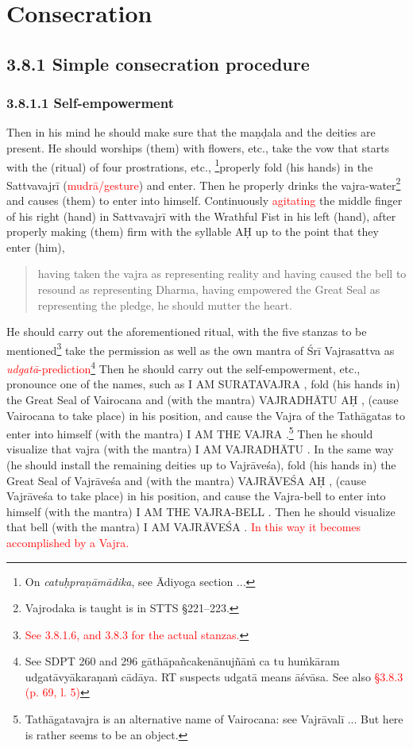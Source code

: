 \documentclass[11pt]{book}
\makeatletter
\def\fakesc#1{%
  \begingroup%
  \xdef\fake@name{\csname\curr@fontshape/\f@size\endcsname}%
  \fontsize{1.3\fontdimen8\fake@name}{\baselineskip}\selectfont%
  \uppercase{#1}%
  \endgroup%
}
\newcommand{\mantra}[1]{\fakesc{#1}}
\newcommand{\red}[1]{\textcolor{red}{#1}}
\newcommand{\skt}[1]{\emph{#1}}
\makeatother
\begin{document}
\section{Consecration}
\subsection{3.8.1 Simple consecration procedure}%
\subsubsection{3.8.1.1 Self-empowerment}
Then in his mind he should make sure that the maṇḍala and the deities are present. He should worships (them) with flowers, etc., take the vow that starts with the (ritual) of four prostrations, etc., \footnote{On \skt{catuḥpraṇāmādika}, see Ādiyoga section ...}properly fold (his hands) in the Sattvavajrī (\red{mudrā/gesture}) and enter. Then he properly drinks the vajra-water\footnote{Vajrodaka is taught is in STTS §221–223.} and causes (them) to enter into himself.  Continuously  \red{agitating} the middle finger of his right (hand) in Sattvavajrī with the Wrathful Fist in his left (hand), after properly making (them) firm with the syllable \mantra{aḥ} up to the point that they enter (him),

\begin{verse}
having taken the vajra as representing reality and having caused the bell to resound as representing Dharma, having empowered the Great Seal as representing the pledge, he should mutter the heart.
\end{verse}

He should carry out the aforementioned ritual, with the five stanzas to be mentioned\footnote{\red{See 3.8.1.6, and 3.8.3 for the actual stanzas.}} take the permission as well as the own mantra of Śrī Vajrasattva as \red{\skt{udgatā}-prediction}\footnote{See SDPT 260 and 296 gāthāpañcakenānujñāṁ ca tu huṁkāram udgatāvyākaraṇaṁ cādāya. RT suspects udgatā means āśvāsa. See also \red{§3.8.3 (p. 69, l. 5)}} Then he should carry out the self-empowerment, etc., pronounce one of the names, such as \mantra{I am Suratavajra}, fold (his hands in) the Great Seal of Vairocana and (with the mantra) \mantra{vajradhātu aḥ}, (cause Vairocana to take place) in his position, and cause the Vajra of the Tathāgatas to enter into himself (with the mantra) \mantra{I am the Vajra}.\footnote{Tathāgatavajra is an alternative name of Vairocana: see Vajrāvalī ... But here is rather seems to be an object.} Then he should visualize that vajra (with the mantra) \mantra{I am Vajradhātu}. In the same way (he should install the remaining deities up to Vajrāveśa), fold (his hands in) the Great Seal of Vajrāveśa and (with the mantra) \mantra{vajrāveśa aḥ}, (cause Vajrāveśa to take place) in his position, and cause the Vajra-bell to enter into himself (with the mantra) \mantra{I am the Vajra-bell}. Then he should visualize that bell (with the mantra) \mantra{I am Vajrāveśa}. \red{In this way it becomes accomplished by a Vajra.}
\end{document}

